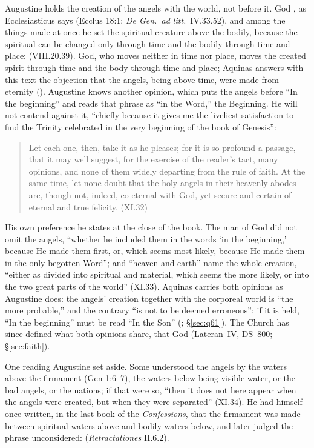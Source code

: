 Augustine holds the creation of the angels with the world, not before it.
God , as Ecclesiasticus says (Ecclus 18:1;
\emph{De Gen.\ ad litt.}\ IV.33.52), and among the things made at once he
set the spiritual creature above the bodily, because the spiritual can be
changed only through time and the bodily through time and place:
 (VIII.20.39). God, who moves neither in time nor place, moves the
created spirit through time and the body through time and place; Aquinas
answers with this text the objection that the angels, being above time,
were made from eternity (). Augustine knows another
opinion, which puts the angels before ``In the beginning'' and reads that
phrase as ``in the Word,'' the Beginning. He will not contend against it,
``chiefly because it gives me the liveliest satisfaction to find the
Trinity celebrated in the very beginning of the book of Genesis'':
\begin{quote}
Let each one, then, take it as he pleases; for it is so profound a
passage, that it may well suggest, for the exercise of the reader's tact,
many opinions, and none of them widely departing from the rule of faith.
At the same time, let none doubt that the holy angels in their heavenly
abodes are, though not, indeed, co-eternal with God, yet secure and
certain of eternal and true felicity. (XI.32)
\end{quote}
His own preference he states at the close of the book. The man of God
did not omit the angels, ``whether he included them in the words `in the
beginning,' because He made them first, or, which seems most likely,
because He made them in the only-begotten Word''; and ``heaven and earth''
name the whole creation, ``either as divided into spiritual and material,
which seems the more likely, or into the two great parts of the world''
(XI.33). Aquinas carries both opinions as Augustine does: the angels'
creation together with the corporeal world is ``the more probable,'' and
the contrary ``is not to be deemed erroneous''; if it is held, ``In the
beginning'' must be read ``In the Son'' (;
\S\ref{sec:q61}). The Church has since defined what both opinions share,
that God 
(Lateran~IV, DS~800; \S\ref{sec:faith}).

One reading Augustine set aside. Some understood the angels by the waters
above the firmament (Gen 1:6--7), the waters below being visible water,
or the bad angels, or the nations; if that were so, ``then it does not
here appear when the angels were created, but when they were separated''
(XI.34). He had himself once written, in the last book of the
\emph{Confessions}, that the firmament was made between spiritual waters
above and bodily waters below, and later judged the phrase unconsidered:
(\emph{Retractationes} II.6.2).

